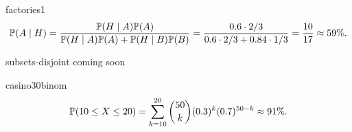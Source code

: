 \begin{sol}{factories1}
    \[
        \mathbb{P}(A\mid H)=\frac{\mathbb{P}(H\mid A)\mathbb{P}(A)}{\mathbb{P}(H\mid A)\mathbb{P}(A)+\mathbb{P}(H\mid B)\mathbb{P}(B)}=\frac{0.6\cdot2/3}{0.6\cdot2/3+0.84\cdot1/3}=\frac{10}{17}\approx59\%.
    \]
\end{sol}

\begin{sol}{subsets-disjoint}
    coming soon
\end{sol}

\begin{sol}{casino30binom}
    \[
        \mathbb{P}(10\le X\le20)=\sum_{k=10}^{20}\binom{50}{k}(0.3)^k(0.7)^{50-k}\approx91\%.
    \]
\end{sol}